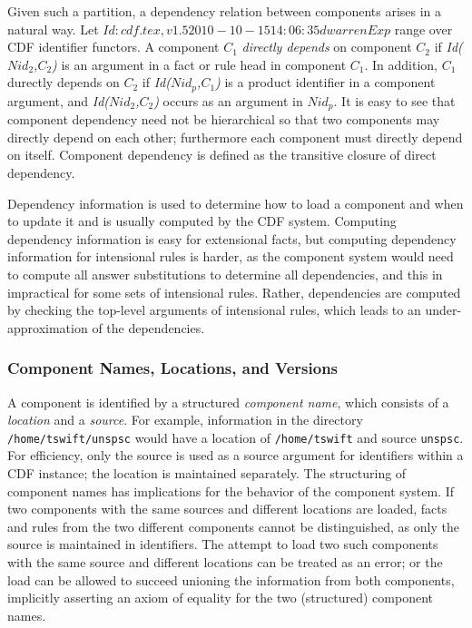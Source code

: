 Given such a partition, a dependency relation between components
arises in a natural way.  Let $Id: cdf.tex,v 1.5 2010-10-15 14:06:35 dwarren Exp $ range over CDF identifier functors.
A component $C_1$ {\em directly depends} on component $C_2$ if {\em
Id($Nid_2$,$C_2$)} is an argument in a fact or rule head in component
$C_1$.  In addition, $C_1$ durectly depends on $C_2$ if {\em
Id($Nid_p$,$C_1$)} is a product identifier in a component argument,
and {\em Id($Nid_2$,$C_2$)} occurs as an argument in $Nid_p$.  It is
easy to see that component dependency need not be hierarchical so that
two components may directly depend on each other; furthermore each
component must directly depend on itself.  Component dependency is
defined as the transitive closure of direct dependency.

Dependency information is used to determine how to load a component
and when to update it and is usually computed by the CDF system.
Computing dependency information is easy for extensional facts, but
computing dependency information for intensional rules is harder, as
the component system would need to compute all answer substitutions to
determine all dependencies, and this in impractical for some sets of
intensional rules.  Rather, dependencies are computed by checking the
top-level arguments of intensional rules, which leads to an
under-approximation of the dependencies.

\subsubsection{Component Names, Locations, and Versions}

A component is identified by a structured {\em component name}, which
consists of a {\em location} and a {\em source}.  For example,
information in the directory {\tt /home/tswift/unspsc} would have a
location of {\tt /home/tswift} and source {\tt unspsc}.  For
efficiency, only the source is used as a source argument for
identifiers within a CDF instance; the location is maintained
separately.  The structuring of component names has implications for
the behavior of the component system.  If two components with the same
sources and different locations are loaded, facts and rules from the
two different components cannot be distinguished, as only the source
is maintained in identifiers.  The attempt to load two such components
with the same source and different locations can be treated as an
error; or the load can be allowed to succeed unioning the information
from both components, implicitly asserting an axiom of equality for
the two (structured) component names.

